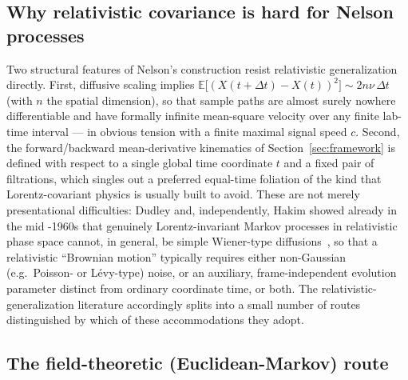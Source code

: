 \documentclass[11pt]{article}
\newcommand{\E}{\mathbb{E}}
\begin{document}
\subsection{Why relativistic covariance is hard for Nelson processes}\label{sec:rel_obstruction}

Two structural features of Nelson's construction resist relativistic
generalization directly. First, diffusive scaling implies 
$\E\big[(X(t+\Delta t)-X(t))^2\big]\sim 2n\nu\,\Delta t$ (with $n$ the
spatial dimension), so that sample paths are almost surely nowhere
differentiable and have formally infinite mean-square velocity over any
finite lab-time interval --- in obvious tension with a finite maximal
signal speed $c$. Second, the forward/backward mean-derivative kinematics
of Section~\ref{sec:framework} is defined with respect to a single global
time coordinate $t$ and a fixed pair of filtrations, which singles out a
preferred equal-time foliation of the kind that Lorentz-covariant physics
is usually built to avoid. These are not merely presentational
difficulties: Dudley and, independently, Hakim showed already in the mid
-1960s that genuinely Lorentz-invariant Markov processes in relativistic
phase space cannot, in general, be simple Wiener-type
diffusions~\cite{dudley65,hakim65,hakim68}, so that a relativistic
``Brownian motion'' typically requires either non-Gaussian (e.g.\ Poisson-
or L\'evy-type) noise, or an auxiliary, frame-independent evolution
parameter distinct from ordinary coordinate time, or both. 
The relativistic-generalization literature accordingly splits into a small
number of routes distinguished by which of these accommodations they adopt.

\subsection{The field-theoretic (Euclidean-Markov) route}
\end{document}
